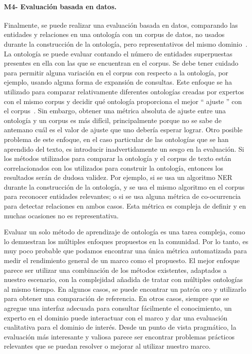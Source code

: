     \paragraph{M4- Evaluación basada en datos.}
    Finalmente, se puede realizar una evaluación basada en datos, comparando las entidades y relaciones en una ontología con un corpus de datos, no usados ​​durante la construcción de la ontología, pero representativos del mismo dominio~\cite{brank2005survey}.
    La ontología se puede evaluar contando el número de entidades superpuestas presentes en ella con las que se encuentran en el corpus.
    Se debe tener cuidado para permitir alguna variación en el corpus con respecto a la ontología, por ejemplo, usando alguna forma de expansión de consultas.
    Este enfoque se ha utilizado para comparar relativamente diferentes ontologías creadas por expertos con el mismo corpus y decidir qué ontología proporciona el mejor `` ajuste '' con el corpus~\cite{brewster2004data}.
    Sin embargo, obtener una métrica absoluta de ajuste entre una ontología y un corpus es más difícil, principalmente porque no se sabe de antemano cuál es el valor de ajuste que uno debería esperar lograr.
    Otro posible problema de este enfoque, en el caso particular de las ontologías que se han aprendido del texto, es introducir inadvertidamente un sesgo en la evaluación.
    Si los métodos utilizados para comparar la ontología y el corpus de texto están correlacionados con los utilizados para construir la ontología, entonces los resultados serán de dudosa validez.
    Por ejemplo, si se usa un algoritmo NER durante la construcción de la ontología, y se usa el mismo algoritmo en el corpus para reconocer entidades relevantes; o si se usa alguna métrica de co-ocurrencia para detectar relaciones en ambos casos.
    Esta métrica es compleja de definir y en muchas ocasiones no es representativa.

    \vspace{1em}

    Evaluar un solo método de aprendizaje de ontología es una tarea compleja, como lo demuestran los múltiples enfoques propuestos en la comunidad.
    Por lo tanto, es muy poco probable que podamos encontrar una única métrica automatizada para medir el rendimiento general de un marco como el propuesto.
    El mejor enfoque parece ser utilizar una combinación de los métodos existentes, adaptados a nuestro escenario, con la complejidad añadida de tratar con múltiples ontologías al mismo tiempo.
    En algunos casos, se puede encontrar un patrón oro y utilizarlo para obtener una comparación de referencia.
    En otros casos, siempre que se agregue una interfaz adecuada para consultar fácilmente el conocimiento, un experto en el dominio puede interactuar con el marco y dar una evaluación cualitativa para el dominio de interés.
    Desde un punto de vista pragmático, la evaluación más interesante y valiosa parece ser encontrar problemas prácticos relevantes que se puedan resolver o mejorar al utilizar nuestro marco.


